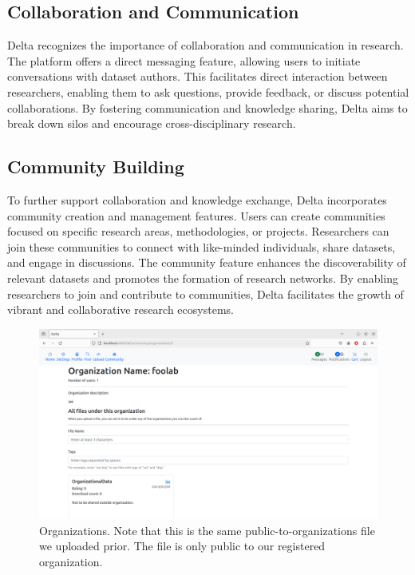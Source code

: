 \documentclass[conference]{IEEEtran}
\begin{document}
\subsection{Collaboration and Communication}
Delta recognizes the importance of collaboration and communication in research. The platform offers a direct messaging feature, allowing users to initiate conversations with dataset authors. This facilitates direct interaction between researchers, enabling them to ask questions, provide feedback, or discuss potential collaborations. By fostering communication and knowledge sharing, Delta aims to break down silos and encourage cross-disciplinary research.

\subsection{Community Building}
To further support collaboration and knowledge exchange, Delta incorporates community creation and management features. Users can create communities focused on specific research areas, methodologies, or projects. Researchers can join these communities to connect with like-minded individuals, share datasets, and engage in discussions. The community feature enhances the discoverability of relevant datasets and promotes the formation of research networks. By enabling researchers to join and contribute to communities, Delta facilitates the growth of vibrant and collaborative research ecosystems.
\begin{figure}[h]
  \centering
  \includegraphics[width=\columnwidth]{figures/organization.png}
  \caption{Organizations. Note that this is the same public-to-organizations file we uploaded prior. The file is only public to our registered organization.}
  \label{fig:delta-organization}
\end{figure}
\end{document}
